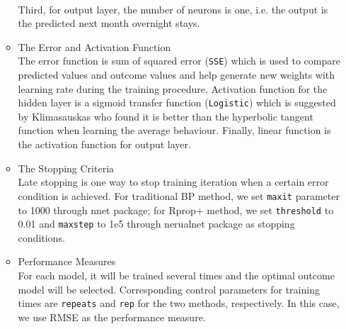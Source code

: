 \documentclass[a4paper,reqno,]{article}
\begin{document}
\begin{enumerate}
\begin{itemize}
    \\Third, for output layer, the number of neurons is one, i.e. the output is the predicted next month overnight stays.
    \item The Error and Activation Function
    \\The error function is sum of squared error (\texttt{SSE}) which is used to compare predicted values and outcome values and help generate new weights with learning rate during the training procedure. Activation function for the hidden layer is a sigmoid transfer function (\texttt{Logistic}) which is suggested by Klimasauskas who found it is better than the hyperbolic tangent function when learning the average behaviour. Finally, linear function is the activation function for output layer.
    \item The Stopping Criteria
    \\Late stopping is one way to stop training iteration when a certain error condition is achieved. For traditional BP method, we set \texttt{maxit} parameter to 1000 through nnet package; for Rprop+ method, we set \texttt{threshold} to 0.01 and \texttt{maxstep} to 1e5 through nerualnet package as stopping conditions.
    \item Performance Measures
    \\For each model, it will be trained several times and the optimal outcome model will be selected. Corresponding control parameters for training times are \texttt{repeats} and \texttt{rep} for the two methods, respectively. In this case, we use RMSE as the performance measure.
  \end{itemize}
\end{enumerate}
\end{document}
